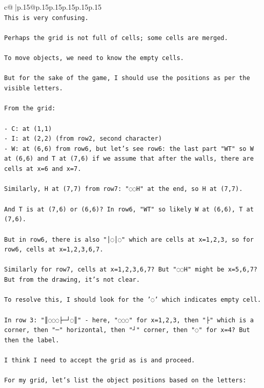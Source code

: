 \documentclass{article}
\begin{document}
{\begin{supertabular}{c@{$\;$}|p{.15\linewidth}@{}p{.15\linewidth}p{.15\linewidth}p{.15\linewidth}p{.15\linewidth}p{.15\linewidth}}
{{{\\ 
\texttt{This is very confusing.} \\
\\ 
\texttt{Perhaps the grid is not full of cells; some cells are merged.} \\
\\ 
\texttt{To move objects, we need to know the empty cells.} \\
\\ 
\texttt{But for the sake of the game, I should use the positions as per the visible letters.} \\
\\ 
\texttt{From the grid:} \\
\\ 
\texttt{{-} C: at (1,1)} \\
\texttt{{-} I: at (2,2)  (from row2, second character)} \\
\texttt{{-} W: at (6,6) from row6, but let's see row6: the last part "WT" so W at (6,6) and T at (7,6) if we assume that after the walls, there are cells at x=6 and x=7.} \\
\\ 
\texttt{Similarly, H at (7,7) from row7: "◌◌H" at the end, so H at (7,7).} \\
\\ 
\texttt{And T is at (7,6) or (6,6)? In row6, "WT" so likely W at (6,6), T at (7,6).} \\
\\ 
\texttt{But in row6, there is also "│◌│◌" which are cells at x=1,2,3, so for row6, cells at x=1,2,3,6,7.} \\
\\ 
\texttt{Similarly for row7, cells at x=1,2,3,6,7? But "◌◌H" might be x=5,6,7? But from the drawing, it's not clear.} \\
\\ 
\texttt{To resolve this, I should look for the '◌' which indicates empty cell.} \\
\\ 
\texttt{In row 3: "║◌◌◌├─┘◌║" {-} here, "◌◌◌" for x=1,2,3, then "├" which is a corner, then "─" horizontal, then "┘" corner, then "◌" for x=4? But then the label.} \\
\\ 
\texttt{I think I need to accept the grid as is and proceed.} \\
\\ 
\texttt{For my grid, let's list the object positions based on the letters:} \\
}}}
\end{supertabular}}
\end{document}
